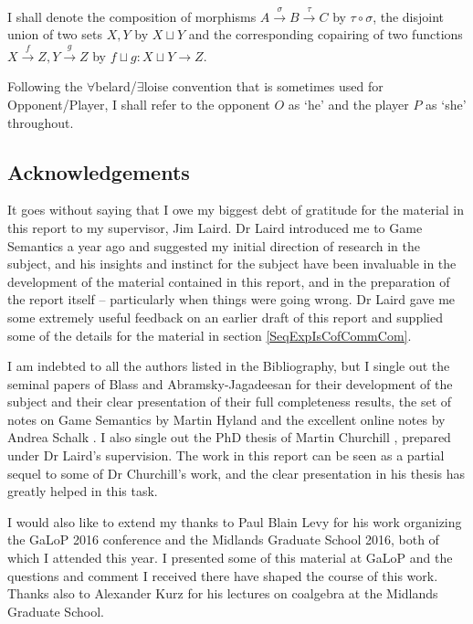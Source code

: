\documentclass[11pt]{article} %
\theoremstyle{plain} %
\theoremstyle{definition} %
\theoremstyle{note}
\theoremstyle{exercisestyle}
\newcommand{\map}[3]{#2\xrightarrow{#1} #3}
\newcommand*\from{\colon}
\newcommand{\cmap}[3]{#1\from{}#2\to{}#3}
\newcommand{\comp}[2]{#1 \circ #2}
\newcommand{\cprd}{\sqcup}
\begin{document}
I shall denote the composition of morphisms $A\xrightarrow{\sigma}B\xrightarrow{\tau}C$ by $\comp\tau\sigma$, the disjoint union of two sets $X,Y$ by $X\cprd Y$ and the corresponding copairing of two functions $\map{f}{X}{Z},\map{g}{Y}{Z}$ by $\cmap{f\cprd g}{X\cprd Y}{Z}$.  

Following the $\forall$belard/$\exists$loise convention that is sometimes used for Opponent/Player, I shall refer to the opponent $O$ as `he' and the player $P$ as `she' throughout.  

\subsection{Acknowledgements}

It goes without saying that I owe my biggest debt of gratitude for the material in this report to my supervisor, Jim Laird.  Dr Laird introduced me to Game Semantics a year ago and suggested my initial direction of research in the subject, and his insights and instinct for the subject have been invaluable in the development of the material contained in this report, and in the preparation of the report itself -- particularly when things were going wrong.  Dr Laird gave me some extremely useful feedback on an earlier draft of this report and supplied some of the details for the material in section \ref{SeqExpIsCofCommCom}.

I am indebted to all the authors listed in the Bibliography, but I single out the seminal papers of Blass \cite{blassgames} and Abramsky-Jagadeesan \cite{abramskyjagadeesangames} for their development of the subject and their clear presentation of their full completeness results, the set of notes on Game Semantics by Martin Hyland \cite{hyland1997games} and the excellent online notes by Andrea Schalk \cite{Schalk2001GsNotes,SchalkWhatIs}.  I also single out the PhD thesis of Martin Churchill \cite{martinsthesis}, prepared under Dr Laird's supervision.  The work in this report can be seen as a partial sequel to some of Dr Churchill's work, and the clear presentation in his thesis has greatly helped in this task.  

I would also like to extend my thanks to Paul Blain Levy for his work organizing the GaLoP 2016 conference and the Midlands Graduate School 2016, both of which I attended this year.  I presented some of this material at GaLoP and the questions and comment I received there have shaped the course of this work.  Thanks also to Alexander Kurz for his lectures on coalgebra at the Midlands Graduate School.  
\end{document}
